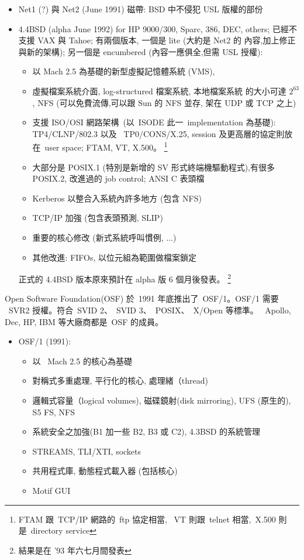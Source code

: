 \documentclass{article}
\begin{document}
\begin{CJK*}{Bg5}{ming}
{\begin{itemize}
         \item Net1 (?) 與 Net2 (June 1991) 磁帶: BSD 中不侵犯 USL 版權的部份

         \item 4.4BSD (alpha June 1992) for HP 9000/300, Sparc, 386, DEC, others;
           已經不支援 VAX 與 Tahoe; 有兩個版本, 一個是 lite (大約是 Net2 的
           內容,加上修正與新的架構); 另一個是 encumbered (內容一應俱全,但需
           USL 授權):
	   \begin{itemize}
           \item 以 Mach 2.5 為基礎的新型虛擬記憶體系統 (VMS),
           \item 虛擬檔案系統介面, log-structured 檔案系統, 本地檔案系統
             的大小可達 $2^63$, NFS (可以免費流傳,可以跟 Sun 的 NFS 並存,
             架在 UDP 或 TCP 之上)
           \item 支援 ISO/OSI 網路架構~(以~ISODE 此一~implementation 為基礎): TP4/CLNP/802.3 以及
             ~TP0/CONS/X.25, session 及更高層的協定則放在~user space;
             FTAM, VT, X.500。
	     \footnote{FTAM 跟~TCP/IP 網路的~ftp 協定相當,
                      ~VT 則跟~telnet 相當,~X.500 則是~directory service}

           \item 大部分是 POSIX.1 (特別是新增的 SV 形式終端機驅動程式),有很多
             POSIX.2, 改進過的 job control; ANSI C 表頭檔
           \item Kerberos 以整合入系統內許多地方 (包含 NFS)
           \item TCP/IP 加強 (包含表頭預測, SLIP)
           \item 重要的核心修改 (新式系統呼叫慣例, ...)
           \item 其他改進: FIFOs, 以位元組為範圍做檔案鎖定
	   \end{itemize}
           正式的 4.4BSD 版本原來預計在 alpha 版 6 個月後發表。
           \footnote{結果是在 '93 年六七月間發表}
\end{itemize}

    Open Software Foundation(OSF) 於~1991 年底推出了~OSF/1。OSF/1 需要 
    ~SVR2 授權。符合~SVID 2、~SVID 3、~POSIX、~X/Open 等標準。
    ~Apollo, Dec, HP, IBM 等大廠商都是~OSF 的成員。
\begin{itemize}
         \item OSF/1 (1991):
	 \begin{itemize}
           \item 以 ~Mach 2.5 的核心為基礎
           \item 對稱式多重處理, 平行化的核心, 處理緒（thread)
           \item 邏輯式容量（logical volumes), 磁碟鏡射(disk mirroring),
             UFS (原生的), S5 FS, NFS
           \item 系統安全之加強(B1 加一些 B2, B3 或 C2), 4.3BSD 的系統管理
           \item STREAMS, TLI/XTI, sockets
           \item 共用程式庫, 動態程式載入器 (包括核心)
           \item Motif GUI
	 \end{itemize}


\end{itemize}}
\end{CJK*}
\end{document}
